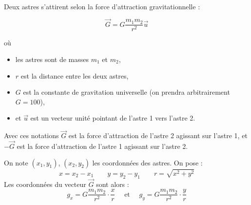 \documentclass[11pt,class=report,crop=false]{standalone}
\begin{document}
\begin{cours}

Deux astres s'attirent selon la force d'attraction gravitationnelle :

\begin{minipage}{0.4\textwidth}  
$$\vec G = G \frac{m_1 m_2}{r^2} \vec u$$
\end{minipage}
\begin{minipage}{0.4\textwidth}  
\end{minipage}

où
\begin{itemize}
  \item les astres sont de masses $m_1$ et $m_2$,
  \item $r$ est la distance entre les deux astres,
  \item $G$ est la constante de gravitation universelle (on prendra arbitrairement $G=100$),
  \item et $\vec u$ est un vecteur unité pointant de l'astre 1 vers l'astre 2.
\end{itemize}

Avec ces notations $\vec G$ est la force d'attraction de l'astre 2 agissant sur l'astre 1,
et $-\vec G$ est la force d'attraction de l'astre 1 agissant sur l'astre 2. 

On note $(x_1,y_1)$, $(x_2,y_2)$ les coordonnées des astres.
On pose :
$$x = x_2-x_1 \qquad  y = y_2-y_1 \qquad r = \sqrt{x^2+y^2}$$
Les coordonnées du vecteur $\vec G$ sont alors :
$$g_x = G \frac{m_1 m_2}{r^2} \cdot \frac{x}{r} 
\quad \text{ et } \quad
g_y = G \frac{m_1 m_2}{r^2} \cdot \frac{y}{r}$$  

\end{cours}



\end{document}
